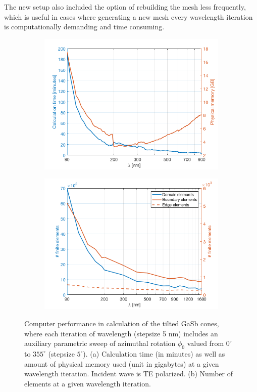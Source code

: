 The new setup also included the option of rebuilding the mesh less frequently, which is useful in cases where generating a new mesh every wavelength iteration is computationally demanding and time consuming.

\begin{figure}[h]  %
    \begin{subfigure}{0.49\textwidth}
        \centering
        \includegraphics[width=\linewidth]{figures/ch4/gasb/ComputationTime_GaSbCones_wl90-900_phi0-355_log.png}
        \caption{}
        \label{fig:GaSb_comptimeb}
    \end{subfigure}
    \begin{subfigure}{0.49\textwidth}
        \centering
        \includegraphics[width=\linewidth]{figures/ch4/gasb/Elements_vs_wavelength_log.png}
        \caption{}
        \label{fig:GaSb_comptimea}
    \end{subfigure}
    \caption{Computer performance in calculation of the tilted GaSb cones, where each iteration of wavelength (stepsize 5 nm) includes an auxiliary parametric sweep of azimuthal rotation $\phi_0$ valued from $0^\circ$ to $355^\circ$ (stepsize $5^\circ$).  (a) Calculation time (in minutes) as well as amount of physical memory used (unit in gigabytes) at a given wavelength iteration. Incident wave is TE polarized. (b) Number of elements at a given wavelength iteration. }
    \label{fig:GaSb_comptime}
\end{figure}
